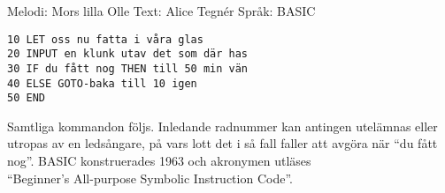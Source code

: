 \begin{song}

\begin{songmeta}
Melodi: Mors lilla Olle
Text: Alice Tegnér
Språk: BASIC
\end{songmeta}

\begin{verbatim}
10 LET oss nu fatta i våra glas
20 INPUT en klunk utav det som där has
30 IF du fått nog THEN till 50 min vän
40 ELSE GOTO-baka till 10 igen
50 END
\end{verbatim}

\begin{songnotes}
Samtliga kommandon följs. Inledande radnummer kan antingen utelämnas eller
utropas av en ledsångare, på vars lott det i så fall faller att avgöra när
\textquotedblleft{}du fått nog\textquotedblright{}. BASIC konstruerades 1963 och akronymen utläses \\
\textquotedblleft{}Beginner's All-purpose Symbolic Instruction Code\textquotedblright{}.
\end{songnotes}

\end{song}
